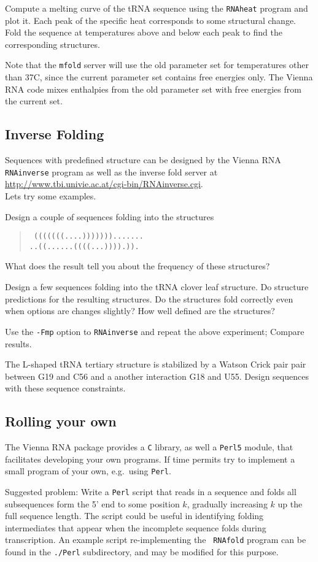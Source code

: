 \documentclass{article}
\begin{document}
Compute a melting curve of the tRNA sequence using the {\tt RNAheat}
program and plot it. Each peak of the specific heat corresponds to some
structural change. Fold the sequence at temperatures above and below each
peak to find the corresponding structures.

Note that the {\tt mfold} server will use the old parameter set for
temperatures other than 37C, since the current parameter set contains free
energies only. The Vienna RNA code mixes enthalpies from the old parameter
set with free energies from the current set.

\subsection{Inverse Folding}

Sequences with predefined structure can be designed by the Vienna RNA {\tt
RNAinverse} program as well as the inverse fold server at\\
\url{http://www.tbi.univie.ac.at/cgi-bin/RNAinverse.cgi}.\\
Lets try some examples.

Design a couple of sequences folding into the structures
\begin{quote}\tt
(((((((....))))))).......\\
..((......((((...)))).)).\\
\end{quote}

What does the result tell you about the frequency of these structures?

Design a few sequences folding into the tRNA clover leaf structure. Do
structure predictions for the resulting structures. Do the structures fold
correctly even when options are changes slightly? How well defined are the
structures?

Use the {\tt -Fmp} option to {\tt RNAinverse} and repeat the above
experiment; Compare results. 

The L-shaped tRNA tertiary structure is stabilized by a Watson Crick pair
pair between G19 and C56 and a another interaction G18 and U55. Design
sequences with these sequence constraints.

\subsection{Rolling your own}

The Vienna RNA package provides a {\tt C} library, as well a {\tt Perl5}
module, that facilitates developing your own programs. If time permits
try to implement a small program of your own, e.g.\ using {\tt Perl}.

Suggested problem: Write a {\tt Perl} script that reads in a sequence and
folds all subsequences form the 5' end to some position $k$, gradually
increasing $k$ up the full sequence length. The script could be useful in
identifying folding intermediates that appear when the incomplete sequence
folds during transcription. An example script re-implementing the {\tt
RNAfold} program can be found in the {\tt ./Perl} subdirectory, and may be
modified for this purpose.
\end{document}
